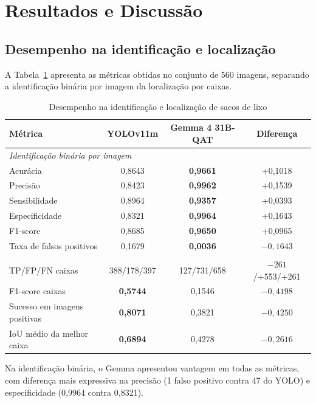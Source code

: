 \documentclass[kdmile,a4paper]{kdmile}
\begin{document}
\section{Resultados e Discussão}
\label{sec:resultados}

\subsection{Desempenho na identificação e localização}
\label{sec:desempenho-preditivo}

A Tabela~\ref{tab:desempenho} apresenta as métricas obtidas no conjunto de 560 imagens, separando a identificação binária por imagem da localização por caixas.

\begin{table}[t]
\centering
\scriptsize
\setlength{\tabcolsep}{4pt}
\renewcommand{\arraystretch}{0.95}
\caption{Desempenho na identificação e localização de sacos de lixo}
\label{tab:desempenho}
\begin{tabular}{lccc}
\toprule
\textbf{Métrica} & \textbf{YOLOv11m} & \textbf{Gemma 4 31B-QAT} & \textbf{Diferença} \\
\midrule
\multicolumn{4}{l}{\textit{Identificação binária por imagem}} \\
Acurácia & 0,8643 & \textbf{0,9661} & +0,1018 \\
Precisão & 0,8423 & \textbf{0,9962} & +0,1539 \\
Sensibilidade & 0,8964 & \textbf{0,9357} & +0,0393 \\
Especificidade & 0,8321 & \textbf{0,9964} & +0,1643 \\
F1-score & 0,8685 & \textbf{0,9650} & +0,0965 \\
Taxa de falsos positivos & 0,1679 & \textbf{0,0036} & $-0,1643$ \\
\addlinespace[2pt]
\multicolumn{4}{l}{\textit{Localização por caixas (IoU $\ge 0,5$)}} \\
TP/FP/FN caixas & 388/178/397 & 127/731/658 & $-261$/+553/+261 \\
F1-score caixas & \textbf{0,5744} & 0,1546 & $-0,4198$ \\
Sucesso em imagens positivas & \textbf{0,8071} & 0,3821 & $-0,4250$ \\
IoU médio da melhor caixa & \textbf{0,6894} & 0,4278 & $-0,2616$ \\
\bottomrule
\end{tabular}
\end{table}

Na identificação binária, o Gemma apresentou vantagem em todas as métricas, com diferença mais expressiva na precisão (1 falso positivo contra 47 do YOLO) e especificidade (0,9964 contra 0,8321).
\end{document}
